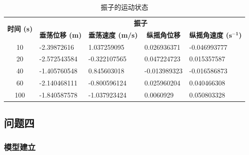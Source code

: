 \documentclass{my_paper}
\begin{document}
\begin{table}[!htbp]
\setlength{\belowcaptionskip}{0.2cm}
\caption{振子的运动状态}
\centering
\begin{tabular}{|c|llll|}
\hline
\multirow{2}{*}{\textbf{时间 (s)}} & \multicolumn{4}{c|}{\textbf{振子}}                                                                                                                                    \\ \cline{2-5} 
                                 & \multicolumn{1}{c|}{\textbf{垂荡位移 (m)}} & \multicolumn{1}{c|}{\textbf{垂荡速度 (m/s)}} & \multicolumn{1}{c|}{\textbf{纵摇角位移}} & \multicolumn{1}{c|}{\textbf{纵摇角速度 ($\bm{s^{-1}}$)}} \\ \hline
10                               & \multicolumn{1}{l|}{-2.39872616}       & \multicolumn{1}{l|}{1.037259095}         & \multicolumn{1}{l|}{0.026936371}    & -0.046993777                              \\ \hline
20                               & \multicolumn{1}{l|}{-2.572543584}      & \multicolumn{1}{l|}{-0.322107565}        & \multicolumn{1}{l|}{0.047224723}    & 0.015357587                               \\ \hline
40                               & \multicolumn{1}{l|}{-1.405760548}      & \multicolumn{1}{l|}{0.845603018}         & \multicolumn{1}{l|}{-0.013989323}   & -0.016586873                              \\ \hline
60                               & \multicolumn{1}{l|}{-2.140468111}      & \multicolumn{1}{l|}{-0.800596124}        & \multicolumn{1}{l|}{0.025960204}    & 0.040466308                               \\ \hline
100                              & \multicolumn{1}{l|}{-1.840587578}      & \multicolumn{1}{l|}{-1.037923424}        & \multicolumn{1}{l|}{0.0060929}      & 0.050803328                               \\ \hline
\end{tabular}

\end{table}


\subsection{问题四}

\subsubsection{模型建立}
\end{document}
